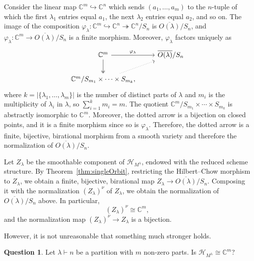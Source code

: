 \documentclass[11pt]{amsart}
\theoremstyle{definition}
\newtheorem{question}[theorem]{Question}
\newcommand{\CC}{\mathbb{C}}
\newcommand{\HH}{\mathcal{H}}
\begin{document}
Consider the linear map $\CC^m \hookrightarrow \CC^n$ which sends $(a_1,\ldots,a_m)$ to the $n$-tuple of which the first $\lambda_1$ entries equal $a_1$, the next $\lambda_2$ entries equal $a_2$, and so on. The image of the composition $\varphi_\lambda \colon \CC^m \hookrightarrow \CC^n \twoheadrightarrow \CC^n/S_n$ is $\overline{O(\lambda)}/S_n$, and $\varphi_\lambda \colon \CC^m \rightarrow \overline{O(\lambda)}/S_n$ is a finite morphism. Moreover, $\varphi_\lambda$ factors uniquely as
\begin{equation*}
    \begin{tikzcd}
        \CC^m \ar[r,"\varphi_\lambda"] \ar[d,two heads]
            & \overline{O(\lambda)}/S_n \\
        \CC^m/S_{m_1} \times \cdots \times S_{m_k}, \ar[ur,dotted]
    \end{tikzcd}
\end{equation*}
where $k = |\{\lambda_1, \ldots, \lambda_m\}|$ is the number of distinct parts of $\lambda$ and $m_i$ is the multiplicity of $\lambda_i$ in $\lambda$, so $\sum_{i=1}^k m_i = m$. The quotient $\CC^m/S_{m_1} \times \cdots \times S_{m_k}$ is abstractly isomorphic to $\CC^m$. Moreover, the dotted arrow is a bijection on closed points, and it is a finite morphism since so is $\varphi_\lambda$. Therefore, the dotted arrow is a finite, bijective, birational morphism from a smooth variety and therefore the normalization of $\overline{O(\lambda)}/S_n$.

Let $Z_\lambda$ be the smoothable component of $\HH_{M^\lambda}$, endowed with the reduced scheme structure. By Theorem~\ref{thm:singleOrbit}, restricting the Hilbert--Chow morphism to $Z_\lambda$, we obtain a finite, bijective, birational map $Z_\lambda \longrightarrow \overline{O(\lambda)}/S_n$. Composing it with the normalization $(Z_\lambda)^\nu$ of $Z_\lambda$, we obtain the normalization of $\overline{O(\lambda)}/S_n$ above. In particular,
\begin{equation*}
    (Z_\lambda)^\nu \cong \CC^m,
\end{equation*}
and the normalization map $(Z_\lambda)^\nu \rightarrow Z_\lambda$ is a bijection.

However, it is not unreasonable that something much stronger holds.

\begin{question}\label{question:singleOrbit}
    Let $\lambda \vdash n$ be a partition with $m$ non-zero parts. Is $\HH_{M^\lambda} \cong \CC^m$?
\end{question}
\end{document}
